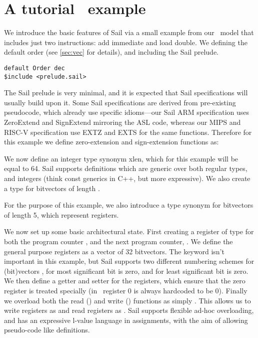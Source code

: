 \section{A tutorial \riscv\ example}
\label{sec:riscv}

We introduce the basic features of Sail via a small example from our
\riscv\ model that includes just two instructions: add immediate and
load double. We defining the default order (see \ref{sec:vec} for
details), and including the Sail prelude.

\begin{lstlisting}
default Order dec
$include <prelude.sail>
\end{lstlisting}

\noindent The Sail prelude is very minimal, and it is expected that
Sail specifications will usually build upon it. Some Sail
specifications are derived from pre-existing pseudocode, which already
use specific idioms---our Sail ARM specification uses ZeroExtend and
SignExtend mirroring the ASL code, whereas our MIPS and RISC-V
specification use EXTZ and EXTS for the same functions. Therefore for
this example we define zero-extension and sign-extension functions as:



We now define an integer type synonym xlen, which for this example
will be equal to 64. Sail supports definitions which are generic over
both regular types, and integers (think const generics in C++, but
more expressive). We also create a type  for bitvectors
of length .


For the purpose of this example, we also introduce a type synonym for
bitvectors of length 5, which represent registers.


We now set up some basic architectural state. First creating a
register of type  for both the program counter , and
the next program counter, . We define the general purpose
registers as a vector of 32  bitvectors. The 
keyword isn't important in this example, but Sail supports two
different numbering schemes for (bit)vectors , for most
significant bit is zero, and  for least significant bit is
zero. We then define a getter and setter for the registers, which
ensure that the zero register is treated specially (in
\riscv\ register 0 is always hardcoded to be 0). Finally we overload
both the read () and write () functions as simply
. This allows us to write registers as  and
read registers as . Sail supports flexible ad-hoc
overloading, and has an expressive l-value language in assignments,
with the aim of allowing pseudo-code like definitions.

